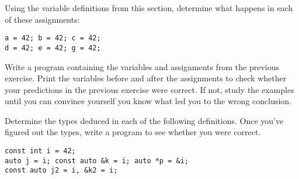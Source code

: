 %
%
\begin{question}
Using the variable definitions from this section, determine
what happens in each of these assignments:
\begin{lstlisting}
a = 42; b = 42; c = 42;
d = 42; e = 42; g = 42;
\end{lstlisting}
\end{question}

\begin{question}
Write a program containing the variables and assignments
from the previous exercise. Print the variables before and after the
assignments to check whether your predictions in the previous exercise were
correct. If not, study the examples until you can convince yourself you know
what led you to the wrong conclusion.
\end{question}

\begin{question}
Determine the types deduced in each of the following
definitions. Once you’ve figured out the types, write a program to see
whether you were correct.
\begin{lstlisting}
const int i = 42;
auto j = i; const auto &k = i; auto *p = &i;
const auto j2 = i, &k2 = i;
\end{lstlisting}
\end{question}
